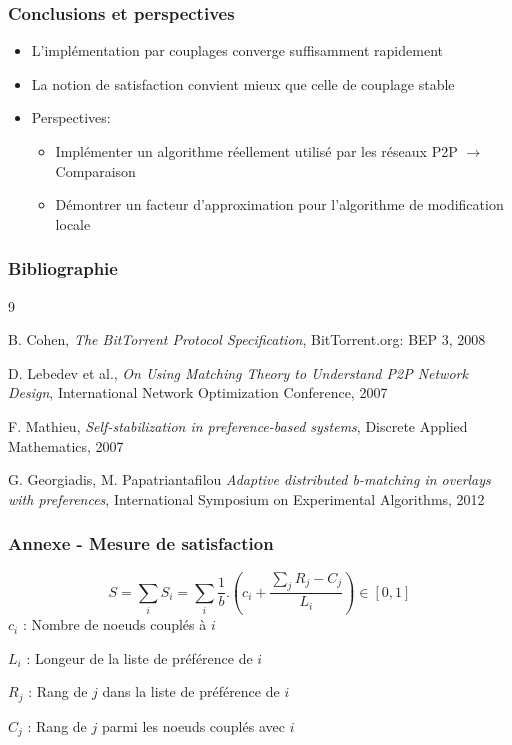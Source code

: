 \documentclass[aspectratio=43]{beamer}
\begin{document}

\begin{frame}
    \frametitle{Conclusions et perspectives}

    \begin{itemize}
        \item L'implémentation par couplages converge suffisamment rapidement
        \item La notion de satisfaction convient mieux que celle de couplage stable
        \item Perspectives: 
        \begin{itemize}
            \item Implémenter un algorithme réellement utilisé par les réseaux P2P $\rightarrow$ Comparaison
            \item Démontrer un facteur d'approximation pour l'algorithme de modification locale
        \end{itemize}
    \end{itemize}

\end{frame}


\begin{frame}
    \frametitle{Bibliographie}

    \begin{thebibliography}{9}

         B. Cohen,
        \textit{The BitTorrent Protocol Specification},
        BitTorrent.org: BEP 3, 2008


        D. Lebedev et al.,
        \textit{On Using Matching Theory to Understand P2P Network Design},
        International Network Optimization Conference, 2007


        F. Mathieu,
        \textit{Self-stabilization in preference-based systems},
        Discrete Applied Mathematics, 2007

        G. Georgiadis, M. Papatriantafilou
        \textit{Adaptive distributed b-matching in overlays with preferences},
        International Symposium on Experimental Algorithms, 2012

    \end{thebibliography}

\end{frame}


\begin{frame}
    \frametitle{Annexe - Mesure de satisfaction}
    \begin{equation}
        S = \sum_{i}{S_i} = 
        \sum_{i}{ \frac{1}{b} . (c_i + \frac{\sum_{j}{R_j - C_j}}{L_i})} \in [0, 1]
    \end{equation}
    $c_i$ : Nombre de noeuds couplés à $i$ 

    $L_i$ : Longeur de la liste de préférence de $i$

    $R_j$ : Rang de $j$ dans la liste de préférence de $i$ 

    $C_j$ : Rang de $j$ parmi les noeuds couplés avec $i$ 

\end{frame}

\end{document}
